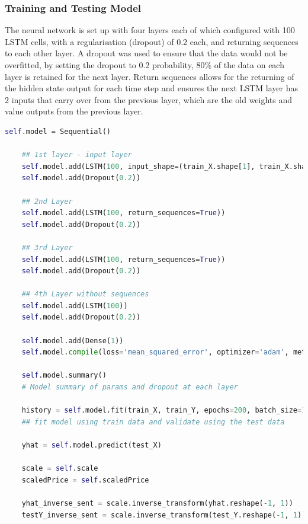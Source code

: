 \documentclass[oneside, 12pt]{article}
\begin{document}
		\subsubsection{Training and Testing Model}
		
		The neural network is set up with four layers each of which configured with 100 LSTM cells, with a regularisation (dropout) of 0.2 each, and returning sequences to each other layer. A dropout was used to ensure that the data would not be overfitted, by setting the dropout to 0.2 probability, 80\% of the data on each layer is retained for the next layer. Return sequences allows for the returning of the hidden state output for each time step and ensures the next LSTM layer has 2 inputs that carry over from the previous layer, which are the old weights and value outputs from the previous layer.
			
		\begin{lstlisting}[language=python, caption=LSTM model creation\, layering\, compiling and fitting]
	self.model = Sequential()
	
	## 1st layer - input layer
	self.model.add(LSTM(100, input_shape=(train_X.shape[1], train_X.shape[2]), return_sequences=True))
	self.model.add(Dropout(0.2))
	
	## 2nd Layer
	self.model.add(LSTM(100, return_sequences=True))
	self.model.add(Dropout(0.2))
	
	## 3rd Layer
	self.model.add(LSTM(100, return_sequences=True))
	self.model.add(Dropout(0.2))
	
	## 4th Layer without sequences
	self.model.add(LSTM(100))
	self.model.add(Dropout(0.2))
	
	self.model.add(Dense(1))
	self.model.compile(loss='mean_squared_error', optimizer='adam', metrics=['mse', 'mae', 'mape'])
	
	self.model.summary()
	# Model summary of params and dropout at each layer
	
	history = self.model.fit(train_X, train_Y, epochs=200, batch_size=1000, validation_data=(test_X, test_Y), verbose=0, shuffle=False, callbacks=[TQDMCallback()])
	## fit model using train data and validate using the test data
	
	yhat = self.model.predict(test_X)
	
	scale = self.scale
	scaledPrice = self.scaledPrice
	
	yhat_inverse_sent = scale.inverse_transform(yhat.reshape(-1, 1))
	testY_inverse_sent = scale.inverse_transform(test_Y.reshape(-1, 1))
		\end{lstlisting}	
		
\end{document}
